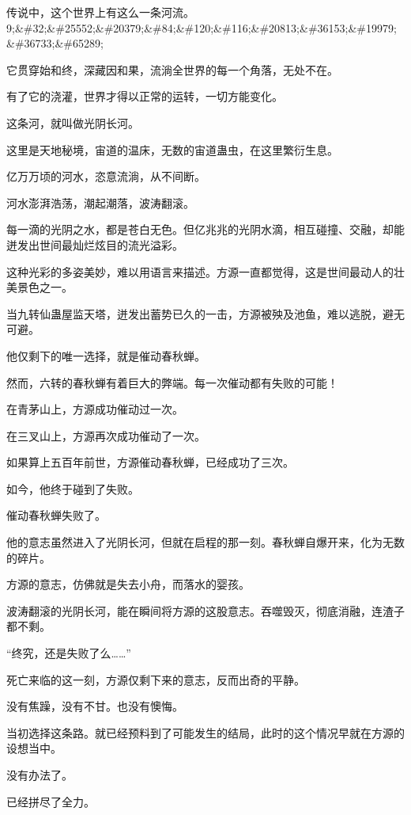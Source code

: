 
\begin{this_body}

传说中，这个世界上有这么一条河流。9;\&\#32;\&\#25552;\&\#20379;\&\#84;\&\#120;\&\#116;\&\#20813;\&\#36153;\&\#19979;\&\#36733;\&\#65289;

它贯穿始和终，深藏因和果，流淌全世界的每一个角落，无处不在。

有了它的浇灌，世界才得以正常的运转，一切方能变化。

这条河，就叫做光阴长河。

这里是天地秘境，宙道的温床，无数的宙道蛊虫，在这里繁衍生息。

亿万万顷的河水，恣意流淌，从不间断。

河水澎湃浩荡，潮起潮落，波涛翻滚。

每一滴的光阴之水，都是苍白无色。但亿兆兆的光阴水滴，相互碰撞、交融，却能迸发出世间最灿烂炫目的流光溢彩。

这种光彩的多姿美妙，难以用语言来描述。方源一直都觉得，这是世间最动人的壮美景色之一。

当九转仙蛊屋监天塔，迸发出蓄势已久的一击，方源被殃及池鱼，难以逃脱，避无可避。

他仅剩下的唯一选择，就是催动春秋蝉。

然而，六转的春秋蝉有着巨大的弊端。每一次催动都有失败的可能！

在青茅山上，方源成功催动过一次。

在三叉山上，方源再次成功催动了一次。

如果算上五百年前世，方源催动春秋蝉，已经成功了三次。

如今，他终于碰到了失败。

催动春秋蝉失败了。

他的意志虽然进入了光阴长河，但就在启程的那一刻。春秋蝉自爆开来，化为无数的碎片。

方源的意志，仿佛就是失去小舟，而落水的婴孩。

波涛翻滚的光阴长河，能在瞬间将方源的这股意志。吞噬毁灭，彻底消融，连渣子都不剩。

“终究，还是失败了么……”

死亡来临的这一刻，方源仅剩下来的意志，反而出奇的平静。

没有焦躁，没有不甘。也没有懊悔。

当初选择这条路。就已经预料到了可能发生的结局，此时的这个情况早就在方源的设想当中。

没有办法了。

已经拼尽了全力。


\end{this_body}

